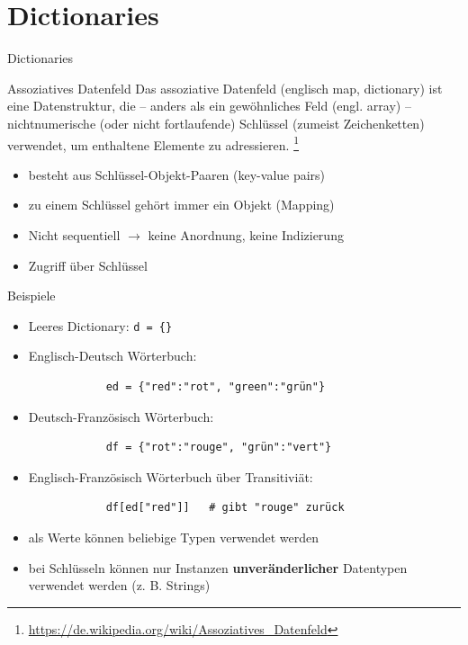 \documentclass[utf8, smaller, c]{beamer}
\begin{document}
\section{Dictionaries}
\begin{frame}{Dictionaries}
	\vspace*{-2mm}
	\begin{block}{Assoziatives Datenfeld}
		Das assoziative Datenfeld (englisch map, dictionary) ist eine Datenstruktur, die --
		anders als ein gewöhnliches Feld (engl. array) – nichtnumerische (oder nicht fortlaufende) Schlüssel (zumeist
		Zeichenketten) verwendet, um enthaltene Elemente zu adressieren.
		\footnote{\url{https://de.wikipedia.org/wiki/Assoziatives_Datenfeld}}
	\end{block}
	\begin{itemize}
		\item besteht aus Schlüssel-Objekt-Paaren (key-value pairs)
		\item zu einem Schlüssel gehört immer ein Objekt (Mapping)
		\item Nicht sequentiell $\rightarrow$ keine Anordnung, keine Indizierung
		\item Zugriff über Schlüssel
	\end{itemize}

	\pagebreak

	\begin{block}{Beispiele}
		\begin{itemize}
			\item Leeres Dictionary: \verb+d = {}+
			\item Englisch-Deutsch Wörterbuch:
			\begin{verbatim}
			ed = {"red":"rot", "green":"grün"}	
			\end{verbatim}	
			\item Deutsch-Französisch Wörterbuch:
			\begin{verbatim}
			df = {"rot":"rouge", "grün":"vert"}
			\end{verbatim}
			\item Englisch-Französisch Wörterbuch über Transitiviät:
			\begin{verbatim}
			df[ed["red"]]   # gibt "rouge" zurück
			\end{verbatim}											
		\end{itemize}
	\end{block}
	\begin{itemize}
		\item als Werte können beliebige Typen verwendet werden
		\item bei Schlüsseln können nur Instanzen \textbf{unveränderlicher} Datentypen verwendet werden (z. B. Strings)
	\end{itemize}


\end{frame}
\end{document}
